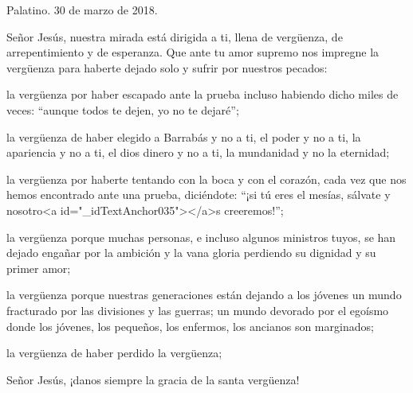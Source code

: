 			\begin{referencia}Palatino. 30 de marzo de 2018.\end{referencia}
			
			\begin{body}Señor Jesús, nuestra mirada está dirigida a ti, llena de vergüenza, de arrepentimiento y de esperanza. Que ante tu amor supremo nos impregne la vergüenza para haberte dejado solo y sufrir por nuestros pecados: \end{body}
			
			\begin{body}la vergüenza por haber escapado ante la prueba incluso habiendo dicho miles de veces: “aunque todos te dejen, yo no te dejaré”; \end{body}
			
			\begin{body}la vergüenza de haber elegido a Barrabás y no a ti, el poder y no a ti, la apariencia y no a ti, el dios dinero y no a ti, la mundanidad y no la eternidad; \end{body}
			
			\begin{body}la vergüenza por haberte tentando con la boca y con el corazón, cada vez que nos hemos encontrado ante una prueba, diciéndote: “¡si tú eres el mesías, sálvate y nosotro<a id="_idTextAnchor035"></a>s creeremos!”;\end{body}
			
			\begin{body}la vergüenza porque muchas personas, e incluso algunos ministros tuyos, se han dejado engañar por la ambición y la vana gloria perdiendo su dignidad y su primer amor; \end{body}
			
			\begin{body}la vergüenza porque nuestras generaciones están dejando a los jóvenes un mundo fracturado por las divisiones y las guerras; un mundo devorado por el egoísmo donde los jóvenes, los pequeños, los enfermos, los ancianos son marginados; \end{body}
			
			\begin{body}la vergüenza de haber perdido la vergüenza;\end{body}
			
			\begin{body}Señor Jesús, ¡danos siempre la gracia de la santa vergüenza!\end{body}
			
